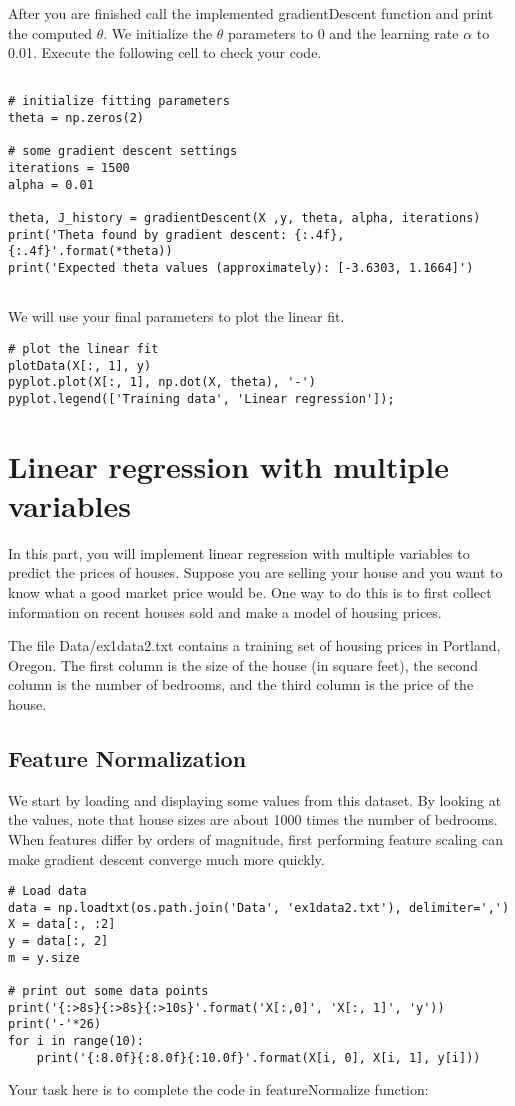 \documentclass[11pt]{article}
\begin{document}
After you are finished call the implemented gradientDescent function and print the computed \(\theta\). We initialize the \(\theta\) parameters to 0 and the learning rate \(\alpha\) to 0.01. Execute the following cell to check your code.
\begin{verbatim}

# initialize fitting parameters
theta = np.zeros(2)

# some gradient descent settings
iterations = 1500
alpha = 0.01

theta, J_history = gradientDescent(X ,y, theta, alpha, iterations)
print('Theta found by gradient descent: {:.4f}, {:.4f}'.format(*theta))
print('Expected theta values (approximately): [-3.6303, 1.1664]')


\end{verbatim}
We will use your final parameters to plot the linear fit.
\begin{verbatim}
# plot the linear fit
plotData(X[:, 1], y)
pyplot.plot(X[:, 1], np.dot(X, theta), '-')
pyplot.legend(['Training data', 'Linear regression']);
\end{verbatim}
\section{Linear regression with multiple variables}
\label{sec:orgf92e12d}
In this part, you will implement linear regression with multiple variables to predict the prices of houses. Suppose you are selling your house and you want to know what a good market price would be. One way to do this is to first collect information on recent houses sold and make a model of housing prices.

The file Data/ex1data2.txt contains a training set of housing prices in Portland, Oregon. The first column is the size of the house (in square feet), the second column is the number of bedrooms, and the third column is the price of the house.


\subsection{Feature Normalization}
\label{sec:org0644ba9}
We start by loading and displaying some values from this dataset. By looking at the values, note that house sizes are about 1000 times the number of bedrooms. When features differ by orders of magnitude, first performing feature scaling can make gradient descent converge much more quickly.

\begin{verbatim}
# Load data
data = np.loadtxt(os.path.join('Data', 'ex1data2.txt'), delimiter=',')
X = data[:, :2]
y = data[:, 2]
m = y.size

# print out some data points
print('{:>8s}{:>8s}{:>10s}'.format('X[:,0]', 'X[:, 1]', 'y'))
print('-'*26)
for i in range(10):
    print('{:8.0f}{:8.0f}{:10.0f}'.format(X[i, 0], X[i, 1], y[i]))
\end{verbatim}
Your task here is to complete the code in featureNormalize function:
\end{document}
